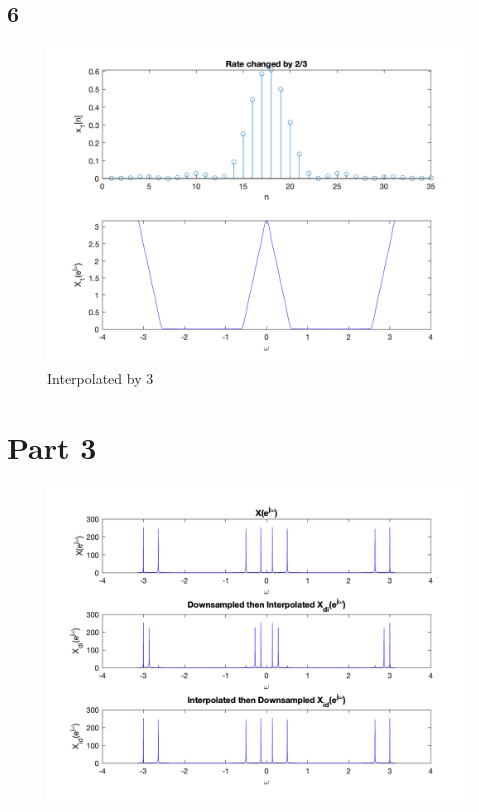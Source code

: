 \documentclass{article}
\begin{document}

\subsection*{6}

\begin{figure}[H]
    \centering
    \includegraphics[scale=0.4]{Rate change.png}
    \caption{Interpolated by 3}
    \label{Rate Change}
\end{figure}


\newpage
\section*{Part 3}

\begin{figure}[H]
    \centering
    \includegraphics[scale=0.4]{Part 3.png}
    \label{Part 3}
\end{figure}
\end{document}
